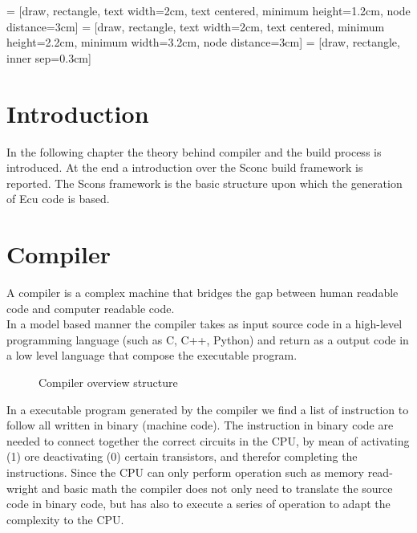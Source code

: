 \documentclass[../main.tex]{subfiles}
\begin{document}
 = [draw, rectangle, text width=2cm, text centered, minimum height=1.2cm, node distance=3cm]
 = [draw, rectangle, text width=2cm, text centered, minimum height=2.2cm, minimum width=3.2cm, node distance=3cm]
 = [draw, rectangle, inner sep=0.3cm]


\section{Introduction}
In the following chapter the theory behind compiler and the build process is introduced. At the end a introduction over the Sconc build framework is reported. The Scons framework is the basic structure upon which the generation of Ecu code is based. 

\section{Compiler}
A compiler is a complex machine that bridges the gap between human readable code and computer readable code.\\
In a model based manner the compiler takes as input source code in a high-level programming language (such as C, C++, Python) and return as a output code in a low level language that compose the executable program. 
\begin{figure}[h]
  \centering
{}
  \caption{Compiler overview structure}
\end{figure}
In a executable program generated by the compiler we find a list of instruction to follow all written in binary (machine code). The instruction in binary code are needed to connect together the correct circuits in the CPU, by mean of activating (1) ore deactivating (0) certain transistors, and therefor completing the instructions. Since the CPU can only perform operation such as memory read-wright and basic math the compiler does not only need to translate the source code in binary code, but has also to execute a series of operation to adapt the complexity to the CPU. 
\end{document}

